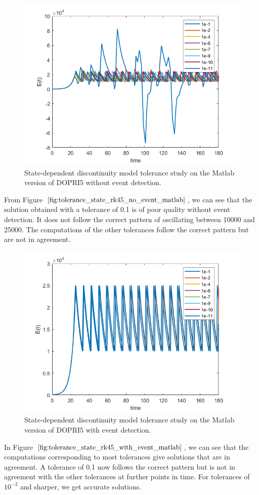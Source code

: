\begin{figure}[h]
\centering
\includegraphics[width=0.7\linewidth]{./figures/tolerance_state_rk45_no_event_matlab}
\caption{State-dependent discontinuity model tolerance study on the Matlab version of DOPRI5 without event detection.}
\label{fig:tolerance_state_rk45_no_event_matlab}
\end{figure}

From Figure $\ref{fig:tolerance_state_rk45_no_event_matlab}$, we can see that the solution obtained with a tolerance of 0.1 is of poor quality without event detection. It does not follow the correct pattern of oscillating between 10000 and 25000. The computations of the other tolerances follow the correct pattern but are not in agreement.

\begin{figure}[h]
\centering
\includegraphics[width=0.7\linewidth]{./figures/tolerance_state_rk45_with_event_matlab}
\caption{State-dependent discontinuity model tolerance study on the Matlab version of DOPRI5 with event detection.}
\label{fig:tolerance_state_rk45_with_event_matlab}
\end{figure}
In Figure $\ref{fig:tolerance_state_rk45_with_event_matlab}$, we can see that the computations corresponding to most tolerances give solutions that are in agreement. A tolerance of 0.1 now follows the correct pattern but is not in agreement with the other tolerances at further points in time. For tolerances of $10^{-2}$ and sharper, we get accurate solutions.

